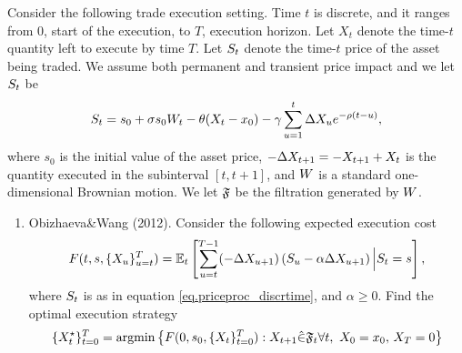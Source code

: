 \documentclass[10pt,a4paper]{article}
\begin{document}
\begin{exercise}
\label{ex.transientimpact_noinfo}
Consider the following trade execution setting. 
Time $t$ is discrete, and it ranges from $0$, start of the execution, to $T$, execution horizon. 
Let $X_t$ denote the time-$t$ quantity left to execute by time $T$. 
Let $S_t$ denote the time-$t$ price of the asset being traded. 
We assume both permanent and transient price impact and we let $S_t$ be
\begin{equation}
\label{eq.priceproc_discrtime}
S_{t} = s_0 + \sigma s_0 W_{t}  
- \theta(X_{t} - x_0) 
- \gamma\sum_{u=1}^{t} \Delta X_{u} e^{-\rho (t-u)},
\end{equation}
where $s_0$ is the initial value of the asset price, $-\Delta X_{t+1} = - X_{t+1} + X_{t}$ is the quantity executed in the subinterval $[t, t+1]$, 
and $W$ is a  standard one-dimensional Brownian motion.
We let $\mathfrak{F}$ be the filtration generated by $W$. 
\begin{enumerate}[label={\textbf{\ref{ex.transientimpact_noinfo}.\arabic{*}}}, ref={Exercise {\ref{ex.transientimpact_noinfo}.\arabic{*}}}]
\item
Obizhaeva\&Wang (2012). 
Consider the following expected execution cost
\begin{equation}
\label{eq.ow12eec}
F(t,s,\lbrace X_{u}\rbrace_{u=t}^{T})
=
\mathbb{{E}}_{t}
\left[
  \sum_{u=t}^{T-1} (-\Delta X_{u+1})\left( S_{u} -\alpha \Delta X_{u+1}\right)
\Big\vert S_t = s 
\right],
\end{equation}
where $S_t$ is as in equation \eqref{eq.priceproc_discrtime},
and $\alpha\geq0$.
Find the optimal execution strategy 
\begin{equation*}
\lbrace X^{\star}_{t}\rbrace_{t=0}^{T}
=
\mathrm{argmin}
\left\lbrace
F(0,s_0,\lbrace X_{t}\rbrace_{t=0}^{T}):
X_{t+1} \hat{\in} \mathfrak{F}_{t} \forall t, \, \, 
X_0 = x_0, \, X_T = 0
\right \rbrace
\end{equation*}
\end{enumerate}
\end{exercise}
\end{document}
